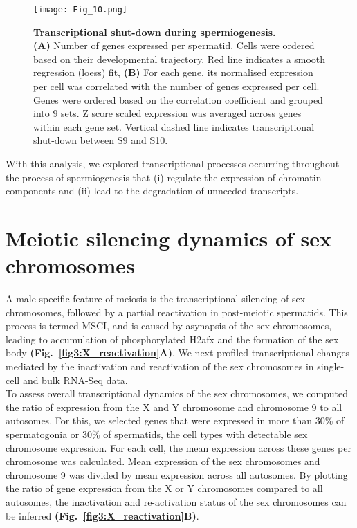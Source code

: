 \begin{figure}[!h]
\centering
\texttt{[image: Fig\_10.png]}
\caption[Transcriptional shut-down during spermiogenesis]{\textbf{Transcriptional shut-down during spermiogenesis.} \\
\textbf{(A)} Number of genes expressed per spermatid. Cells were ordered based on their developmental trajectory. Red line indicates a smooth regression (loess) fit, \textbf{(B)} For each gene, its normalised expression per cell was correlated with the number of genes expressed per cell. Genes were ordered based on the correlation coefficient and grouped into 9 sets. Z score scaled expression was averaged across genes within each gene set. Vertical dashed line indicates transcriptional shut-down between S9 and S10.}
\label{fig3:transcriptional_shutdown}
\end{figure}

With this analysis, we explored transcriptional processes occurring throughout the process of spermiogenesis that (i) regulate the expression of chromatin components and (ii) lead to the degradation of unneeded transcripts.

\newpage

\section{Meiotic silencing dynamics of sex chromosomes}

A male-specific feature of meiosis is the transcriptional silencing of sex chromosomes, followed by a partial reactivation in post-meiotic spermatids. This process is termed \gls{MSCI}, and is caused by asynapsis of the sex chromosomes, leading to accumulation of phosphorylated \gls{H2afx} and the formation of the sex body \citep{Hamer2003} \textbf{(Fig.~\ref{fig3:X_reactivation}A)}. We next profiled transcriptional changes mediated by the inactivation and reactivation of the sex chromosomes in single-cell and bulk RNA-Seq data. \\

To assess overall transcriptional dynamics of the sex chromosomes, we computed the ratio of expression from the X and Y chromosome and chromosome 9 to all autosomes. For this, we selected genes that were expressed in more than 30\% of spermatogonia or 30\% of spermatids, the cell types with detectable sex chromosome expression. For each cell, the mean expression across these genes per chromosome was calculated. Mean expression of the sex chromosomes and chromosome 9 was divided by mean expression across all autosomes. By plotting the ratio of gene expression from the X or Y chromosomes compared to all autosomes, the inactivation and re-activation status of the sex chromosomes can be inferred \textbf{(Fig.~\ref{fig3:X_reactivation}B)}. \\

